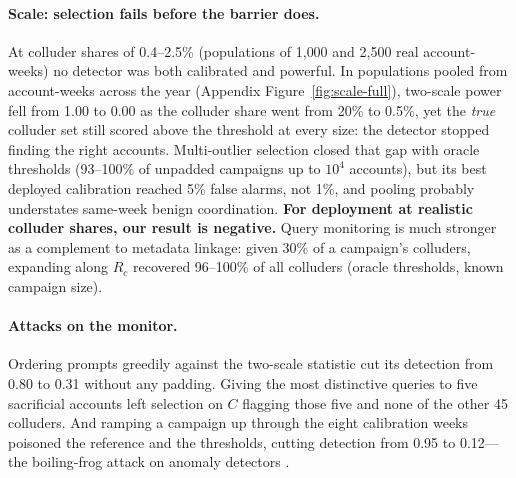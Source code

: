 \paragraph{Scale: selection fails before the barrier does.} At colluder shares of 0.4--2.5\% (populations of 1{,}000 and 2{,}500 real account-weeks) no detector was both calibrated and powerful. In populations pooled from account-weeks across the year (Appendix Figure~\ref{fig:scale-full}), two-scale power fell from 1.00 to 0.00 as the colluder share went from 20\% to 0.5\%, yet the \emph{true} colluder set still scored above the threshold at every size: the detector stopped finding the right accounts. Multi-outlier selection closed that gap with oracle thresholds (93--100\% of unpadded campaigns up to $10^4$ accounts), but its best deployed calibration reached 5\% false alarms, not 1\%, and pooling probably understates same-week benign coordination. \textbf{For deployment at realistic colluder shares, our result is negative.} Query monitoring is much stronger as a complement to metadata linkage: given 30\% of a campaign's colluders, expanding along $R_c$ recovered 96--100\% of all colluders (oracle thresholds, known campaign size).

\paragraph{Attacks on the monitor.} Ordering prompts greedily against the two-scale statistic cut its detection from 0.80 to 0.31 without any padding. Giving the most distinctive queries to five sacrificial accounts left selection on $C$ flagging those five and none of the other 45 colluders. And ramping a campaign up through the eight calibration weeks poisoned the reference and the thresholds, cutting detection from 0.95 to 0.12---the boiling-frog attack on anomaly detectors \citep{rubinstein2009antidote}.
